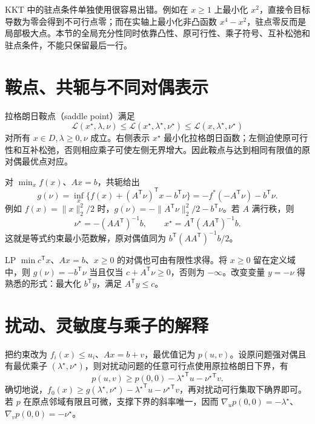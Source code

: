\documentclass[UTF8,12pt,a4paper,fontset=fandol]{ctexbook}
\begin{document}
KKT 中的驻点条件单独使用很容易出错。例如在 $x\geq1$ 上最小化 $x^2$，直接令目标导数为零会得到不可行点零；而在实轴上最小化非凸函数 $x^4-x^2$，驻点零反而是局部极大点。本节的全局充分性同时依靠凸性、原可行性、乘子符号、互补松弛和驻点条件，不能只保留最后一行。

\section{鞍点、共轭与不同对偶表示}

拉格朗日鞍点（saddle point）满足
\[
 \mathcal L(x^\star,\lambda,\nu)
 \leq\mathcal L(x^\star,\lambda^\star,\nu^\star)
 \leq\mathcal L(x,\lambda^\star,\nu^\star)
\]
对所有 $x\in D,\lambda\geq0,\nu$ 成立。右侧表示 $x^\star$ 最小化拉格朗日函数；左侧迫使原可行性和互补松弛，否则相应乘子可使左侧无界增大。因此鞍点与达到相同有限值的原对偶最优点对应。

对 $\min_x f(x)$、$Ax=b$，共轭给出
\[
 g(\nu)=\inf_x\{f(x)+(A^{\mathsf T}\nu)^{\mathsf T}x-b^{\mathsf T}\nu\}
       =-f^*(-A^{\mathsf T}\nu)-b^{\mathsf T}\nu.
\]
例如 $f(x)=\|x\|_2^2/2$ 时，$g(\nu)=-\|A^{\mathsf T}\nu\|_2^2/2-b^{\mathsf T}\nu$。若 $A$ 满行秩，则
\[
 \nu^\star=-(AA^{\mathsf T})^{-1}b,\qquad
 x^\star=A^{\mathsf T}(AA^{\mathsf T})^{-1}b.
\]
这就是等式约束最小范数解，原对偶值同为 $b^{\mathsf T}(AA^{\mathsf T})^{-1}b/2$。

LP $\min c^{\mathsf T}x$、$Ax=b$、$x\geq0$ 的对偶也可由有限性求得。将 $x\geq0$ 留在定义域中，则 $g(\nu)=-b^{\mathsf T}\nu$ 当且仅当 $c+A^{\mathsf T}\nu\geq0$，否则为 $-\infty$。改变变量 $y=-\nu$ 得熟悉的形式：最大化 $b^{\mathsf T}y$，满足 $A^{\mathsf T}y\leq c$。

\section{扰动、灵敏度与乘子的解释}

把约束改为 $f_i(x)\leq u_i$、$Ax=b+v$，最优值记为 $p(u,v)$。设原问题强对偶且有最优乘子 $(\lambda^\star,\nu^\star)$，则对扰动问题的任意可行点使用原拉格朗日下界，有
\begin{equation}
 p(u,v)\geq p(0,0)-{\lambda^\star}^{\mathsf T}u-{\nu^\star}^{\mathsf T}v.
 \label{eq:co-sensitivity-bound}
\end{equation}
确切地说，$f_0(x)\geq g(\lambda^\star,\nu^\star)-{\lambda^\star}^{\mathsf T}u-{\nu^\star}^{\mathsf T}v$，再对扰动可行集取下确界即可。若 $p$ 在原点邻域有限且可微，支撑下界的斜率唯一，因而 $\nabla_up(0,0)=-\lambda^\star$、$\nabla_vp(0,0)=-\nu^\star$。
\end{document}
